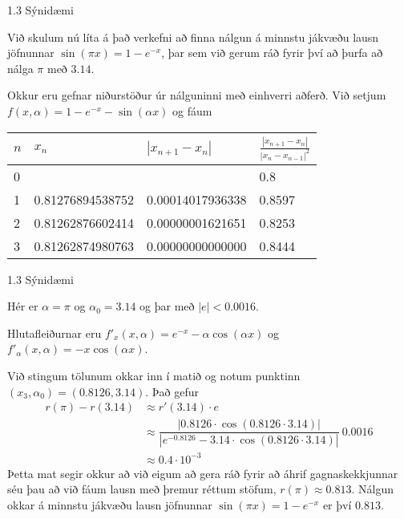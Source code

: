 %
\begin{frame}{1.3 Sýnidæmi} 

Við skulum nú líta á það verkefni að finna nálgun á minnstu jákvæðu 
lausn jöfnunnar $\sin(\pi x)=1-e^{-x}$, þar sem við gerum ráð fyrir 
því að þurfa að nálga $\pi$ með $3.14$.

\pause

Okkur eru gefnar niðurstöður úr nálguninni með einhverri aðferð. 
Við setjum $f(x,\alpha)=1-e^{-x}-\sin(\alpha x)$ og fáum
\begin{center}
\begin{tabular}{l|l|l|l|}
$n$  & $x_n$ &$|x_{n+1}-x_n|$ &  $\frac{|x_{n+1}-x_n|}{|x_n-x_{n-1}|^2}$\\ \hline
   0&  & & 0.8\\
   1&  0.81276894538752 &  0.00014017936338 &  0.8597\\
   2&  0.81262876602414 &  0.00000001621651 &  0.8253\\
   3&   0.81262874980763 &  0.00000000000000 &  0.8444\\
\end{tabular}
\end{center}
\end{frame}
%
%
\begin{frame}{1.3 Sýnidæmi} 

Hér er $\alpha=\pi$ og $\alpha_0=3.14$ og þar með $|e|<0.0016$. 

\pause

Hlutafleiðurnar eru $f'_x(x,\alpha)=e^{-x}-\alpha\cos(\alpha x)$ og
$f'_\alpha(x,\alpha)=-x\cos(\alpha x)$. 

\pause

Við stingum tölunum okkar inn í matið og notum punktinn $(x_3,\alpha_0)=(0.8126,3.14)$. Það gefur 
\begin{align*}
    r(\pi)-r(3.14)&\approx r'(3.14) \cdot e\\
    &\approx
    \dfrac{|0.8126\cdot \cos(0.8126\cdot 3.14)|}{|e^{-0.8126}-3.14
    \cdot \cos(0.8126 \cdot 3.14)|}\ 
    0.0016 \\
    &\approx 0.4\cdot 10^{-3}
\end{align*}\pause
Þetta mat segir okkur að við eigum að gera ráð fyrir að áhrif
gagnaskekkjunnar séu þau að við fáum lausn með þremur réttum stöfum,
$r(\pi) \approx 0.813$. Nálgun okkar á minnstu jákvæðu lausn jöfnunnar $\sin(\pi
x)=1-e^{-x}$ er því $0.813$. 

\end{frame}
%


